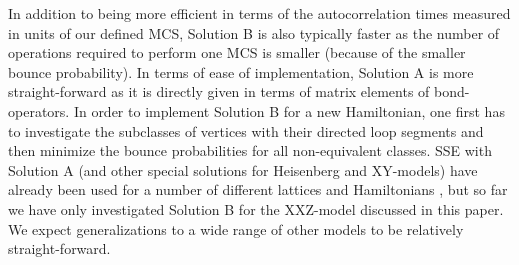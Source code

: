 \documentclass[10pt,pre,aps,twocolumn,showpacs,superscriptaddress,
floatfix]{revtex4}
\begin{document}
In addition to being more efficient in terms of the autocorrelation times
measured in units of our defined MCS, Solution B is also typically faster
as the number of operations required to perform one MCS is smaller (because
of the smaller bounce probability). In terms of ease of implementation,
Solution A is more straight-forward as it is directly given in terms of 
matrix elements of bond-operators. In order to implement Solution B for a 
new Hamiltonian, one first has to investigate the subclasses of vertices 
with their directed loop segments and then minimize the bounce probabilities 
for all non-equivalent classes. SSE with Solution A (and other special
solutions for Heisenberg and XY-models) have already been used for a number 
of different lattices and Hamiltonians \cite{ssexy,ssespin1,ssespin2,wessel1,perc,wessel2,yunoki,hebert,dorneich1,schmid,torsten,pinaki,henelius2}, 
but so far we 
have only investigated Solution B for the XXZ-model discussed in this paper. 
We expect generalizations to a wide range of other models to be relatively
straight-forward.
\end{document}
